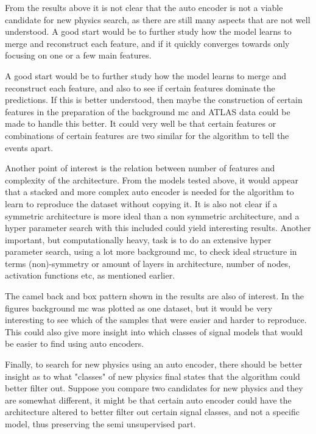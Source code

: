 \documentclass[ reprint, amsmath,amssymb, aps, nofootinbib]{revtex4-2}
\begin{document}
From the results above it is not clear that the auto encoder is not a viable candidate for new physics search, as there are still many aspects that are not well understood. A good start would be to further study how the model learns to merge and reconstruct each feature, and if it quickly converges towards only focusing on one or a few main features. 

A good start would be to further study how the model learns to merge and reconstruct each feature, and also to see if certain features dominate the predictions. If this is better understood, then maybe the construction of certain features in the preparation of the background mc and ATLAS data could be made to handle this better. It could very well be that certain features or combinations of certain features are two similar for the algorithm to tell the events apart. \par 

Another point of interest is the relation between number of features and complexity of the architecture. From the models tested above, it would appear that a stacked and more complex auto encoder is needed for the algorithm to learn to reproduce the dataset without copying it. It is also not clear if a symmetric architecture is more ideal than a non symmetric architecture, and a hyper parameter search with this included could yield interesting results. Another important, but computationally heavy, task is to do an extensive hyper parameter search, using a lot more background mc, to check ideal structure in terms (non)-symmetry or amount of layers in architecture, number of nodes, activation functions etc, as mentioned earlier. \par 

The camel back and box pattern shown in the results are also of interest. In the figures background mc was plotted as one dataset, but it would be very interesting to see which of the samples that were easier and harder to reproduce. This could also give more insight into which classes of signal models that would be easier to find using auto encoders. \par Finally, to search for new physics using an auto encoder, there should be better insight as to what "classes" of new physics final states that the algorithm could better filter out. Suppose you compare two candidates for new physics and they are somewhat different, it might be that certain auto encoder could have the architecture altered to better filter out certain signal classes, and not a specific model, thus preserving the semi unsupervised part.   \par \par
\end{document}
